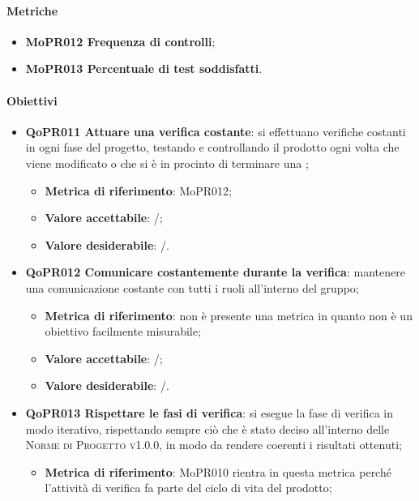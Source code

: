 \documentclass[../piano-di-qualifica.tex]{subfiles}
\begin{document}
\paragraph{Metriche}
\label{sub:metriche_4}
\begin{itemize}
    \item \textbf{MoPR012 Frequenza di controlli};
    \item \textbf{MoPR013 Percentuale di test soddisfatti}.
\end{itemize}

\paragraph{Obiettivi}
\label{sub:obiettivi_4}
\begin{itemize}
    \item \textbf{QoPR011 Attuare una verifica costante}: si effettuano verifiche costanti in ogni fase del progetto, testando e controllando il prodotto ogni volta che viene modificato o che si è in procinto di terminare una ;
    \begin{itemize}
        \item \textbf{Metrica di riferimento}: MoPR012;
        \item \textbf{Valore accettabile}: /; %
        \item \textbf{Valore desiderabile}: /.
    \end{itemize}
    \item \textbf{QoPR012 Comunicare costantemente durante la verifica}: mantenere una comunicazione costante con tutti i ruoli all'interno del gruppo;
    \begin{itemize}
        \item \textbf{Metrica di riferimento}: non è presente una metrica in quanto non è un obiettivo facilmente misurabile;
        \item \textbf{Valore accettabile}: /; %
        \item \textbf{Valore desiderabile}: /.
    \end{itemize}
    \item \textbf{QoPR013 Rispettare le fasi di verifica}: si esegue la fase di verifica in modo iterativo, rispettando sempre ciò che è stato deciso all'interno delle \textsc{Norme di Progetto v1.0.0}, in modo da rendere coerenti i risultati ottenuti;
        \begin{itemize}
            \item \textbf{Metrica di riferimento}: MoPR010 rientra in questa metrica perché l'attività di verifica fa parte del ciclo di vita del prodotto;

\end{itemize}
\end{itemize}
\end{document}
